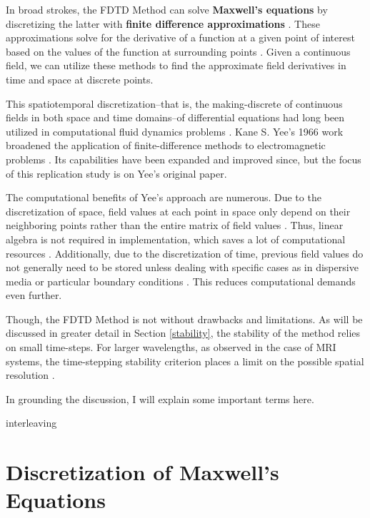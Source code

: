 \documentclass[reprint,preprintnumbers,amsmath,amssymb,aps,nofootinbib,showkeys]{revtex4-2}
\begin{document}
    In broad strokes, the FDTD Method can solve \textbf{Maxwell's equations} by discretizing the latter with \textbf{finite difference approximations} \cite{Utah}. These approximations solve for the derivative of a function at a given point of interest based on the values of the function at surrounding points \cite{Yew}. Given a continuous field, we can utilize these methods to find the approximate field derivatives in time and space at discrete points.

    This spatiotemporal discretization--that is, the making-discrete of continuous fields in both space and time domains--of differential equations had long been utilized in computational fluid dynamics problems \cite{Ohner}. Kane S. Yee's 1966 work broadened the application of finite-difference methods to electromagnetic problems \cite{Yee}. Its capabilities have been expanded and improved since, but the focus of this replication study is on Yee's original paper.

    The computational benefits of Yee's approach are numerous. Due to the discretization of space, field values at each point in space only depend on their neighboring points rather than the entire matrix of field values \cite{Ohner}. Thus, linear algebra is not required in implementation, which saves a lot of computational resources \cite{Ohner}. Additionally, due to the discretization of time, previous field values do not generally need to be stored unless dealing with specific cases as in dispersive media or particular boundary conditions \cite{Ohner}. This reduces computational demands even further.

    Though, the FDTD Method is not without drawbacks and limitations. As will be discussed in greater detail in Section \ref{stability}, the stability of the method relies on small time-steps. For larger wavelengths, as observed in the case of MRI systems, the time-stepping stability criterion places a limit on the possible spatial resolution \cite{Zhao}.

    In grounding the discussion, I will explain some important terms here.

    interleaving
    
    


\section{Discretization of Maxwell's Equations}\label{theory}
\end{document}
